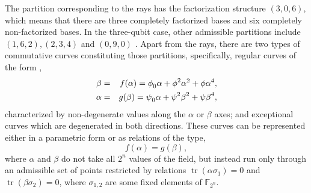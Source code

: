 \documentclass{article}
\DeclareMathOperator{\tr}{tr}
\begin{document}
The partition corresponding to the rays has the factorization structure
$(3,0,6)$, which means that there are three completely factorized bases and six
completely non-factorized bases. In the three-qubit case, other admissible
partitions include $(1,6,2),(2,3,4)$ and $(0,9,0)$ \cite{factor1,factor2}. Apart
from the rays, there are two types of commutative curves constituting those
partitions, specifically, regular curves of the form \cite{GS2}, 
\begin{eqnarray}
  \beta &=& f(\alpha) = \phi_{0}\alpha +\phi^{2} \alpha^{2} + \phi \alpha^{4},
  \label{rc} \\
  \alpha &=& g(\beta) = \psi_{0}\alpha +\psi^{2} \beta^{2} + \psi \beta^{4}, 
  \notag
\end{eqnarray}
characterized by non-degenerate values along the $\alpha$ or $\beta$ axes; and
exceptional curves which are degenerated in both directions. These curves
can be represented either in a parametric form or as relations of the type,
\begin{equation*}
  f(\alpha) = g(\beta),
\end{equation*}
where $\alpha$ and $\beta$ do not take all $2^{n}$ values of the field, but
instead run only through an admissible set of points restricted by relations $
\tr(\alpha \sigma_{1}) = 0$ and $\tr(\beta \sigma_{2}) = 0$, where
$\sigma_{1,2}$ are some fixed elements of $\mathbb{F}_{2^{n}}$.
\end{document}
